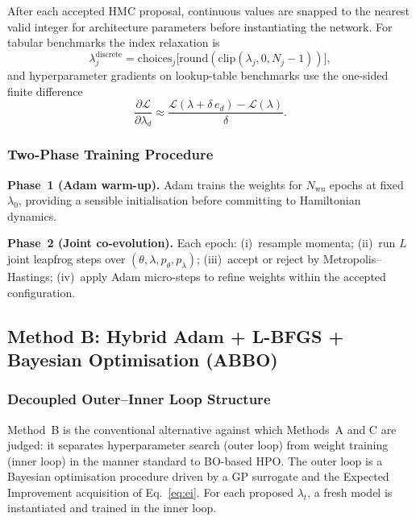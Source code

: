 \documentclass[11pt]{article}
\theoremstyle{definition}
\begin{document}
After each accepted HMC proposal, continuous values are snapped to
the nearest valid integer for architecture parameters before
instantiating the network. For tabular benchmarks the index
relaxation is
\begin{equation}
\lambda_j^{\mathrm{discrete}} = \mathrm{choices}_j\bigl[
   \mathrm{round}(\mathrm{clip}(\lambda_j, 0, N_j-1))\bigr],
\label{eq:index_relax}
\end{equation}
and hyperparameter gradients on lookup-table benchmarks use the
one-sided finite difference
\begin{equation}
\frac{\partial\mathcal{L}}{\partial\lambda_d}
  \approx \frac{\mathcal{L}(\lambda + \delta\,e_d) -
                \mathcal{L}(\lambda)}{\delta}.
\label{eq:fd_grad}
\end{equation}

\subsubsection{Two-Phase Training Procedure}

\textbf{Phase~1 (Adam warm-up).} Adam trains the weights for
$N_{\mathrm{wu}}$ epochs at fixed $\lambda_0$, providing a sensible
initialisation before committing to Hamiltonian dynamics.

\textbf{Phase~2 (Joint co-evolution).} Each epoch: (i)~resample
momenta; (ii)~run $L$ joint leapfrog steps over
$(\theta,\lambda,p_\theta,p_\lambda)$; (iii)~accept or reject by
Metropolis--Hastings; (iv)~apply Adam micro-steps to refine weights
within the accepted configuration.

\subsection{Method B: Hybrid Adam + L-BFGS + Bayesian Optimisation (ABBO)}

\subsubsection{Decoupled Outer--Inner Loop Structure}

Method~B is the conventional alternative against which Methods~A and
C are judged: it separates hyperparameter search (outer loop) from
weight training (inner loop) in the manner standard to BO-based HPO.
The outer loop is a Bayesian optimisation procedure driven by a GP
surrogate and the Expected Improvement acquisition of
Eq.~\eqref{eq:ei}. For each proposed $\lambda_t$, a fresh model is
instantiated and trained in the inner loop.
\end{document}

